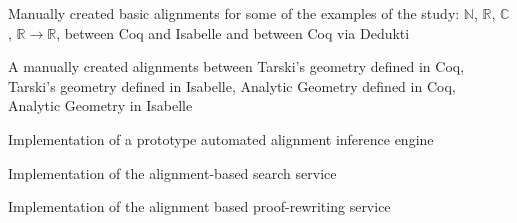 \begin{workpackage}
\begin{wpdelivs}
  \begin{wpdeliv}[due=24,id=aligningnumbers,dissem=PU,nature=DEM,lead=Str,task=aligncasestudies]{Manually created basic alignments for some of the examples of the study: $\mathbb{N}$, $\mathbb{R}$, $\mathbb{C}$, $\mathbb{R} \rightarrow \mathbb{R}$, between Coq and Isabelle and between Coq via Dedukti}\end{wpdeliv}
  
  \begin{wpdeliv}[due=36,id=aligninggeometries,dissem=PU,nature=DEM,lead=Bel,task=aligncasestudies]{A manually created alignments between Tarski's geometry defined in Coq, Tarski's geometry defined in Isabelle, Analytic Geometry defined in Coq, Analytic Geometry in Isabelle}\end{wpdeliv}
  
  \begin{wpdeliv}[due=48,id=automatedalignment,dissem=PU,nature=DEM,lead=Imt,task=aligntheories]{Implementation of a prototype automated alignment inference engine}\end{wpdeliv}
  
  \begin{wpdeliv}[due=48,id=alignsearch,dissem=PU,nature=DEM,lead=Fau,task=alignsearch]{Implementation of the alignment-based search service}\end{wpdeliv}
  
  \begin{wpdeliv}[due=48,id=alignproofrewr,dissem=PU,nature=DEM,lead=Bol,task=alignproofs]{Implementation of the alignment based proof-rewriting service}\end{wpdeliv}
\end{wpdelivs}
\end{workpackage}

